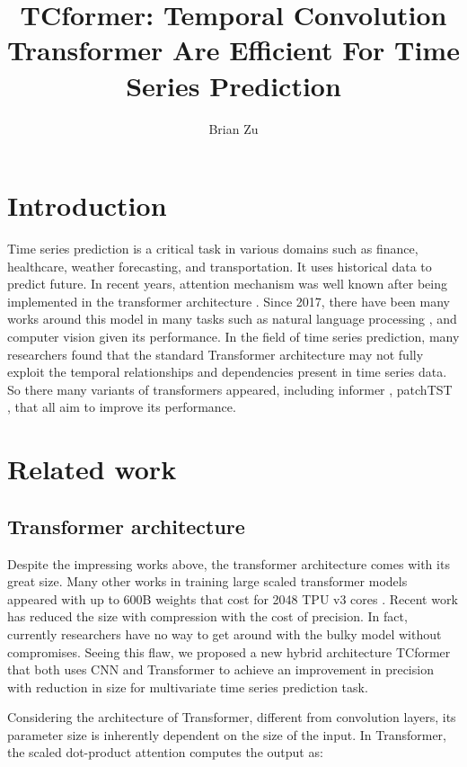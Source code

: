 \documentclass[stu,12pt,floatsintext]{apa7}
\title{TCformer: Temporal Convolution Transformer Are Efficient For Time Series Prediction}
\author{Brian Zu}
\affiliation{}
\begin{document}
\maketitle

\section{Introduction}
Time series prediction is a critical task in various domains such as finance, healthcare, weather forecasting, and transportation. It uses historical data to predict future. In recent years, attention mechanism was well known after being implemented in the transformer architecture \parencite{attention-is-all-you-need}. Since 2017, there have been many works around this model in many tasks such as natural language processing \parencite{few-shot-learners}, and computer vision \parencite{vit} given its performance.  In the field of time series prediction, many researchers found that the standard Transformer architecture may not fully exploit the temporal relationships and dependencies present in time series data. So there many variants of transformers appeared, including informer \parencite{informer}, patchTST \parencite{patchtst}, that all aim to improve its performance. 


\section{Related work}

\subsection{Transformer architecture}

Despite the impressing works above, the transformer architecture comes with its great size. Many other works in training large scaled transformer models appeared with up to 600B weights that cost for 2048 TPU v3 cores \parencite{lepikhin2020gshardscalinggiantmodels}. Recent work \parencite{pmlr-v119-li20m} has reduced the size with compression with the cost of precision. In fact, currently researchers have no way to get around with the bulky model without compromises. Seeing this flaw, we proposed a new hybrid architecture TCformer that both uses CNN and Transformer to achieve an improvement in precision with reduction in size for multivariate time series prediction task. 

Considering the architecture of Transformer, different from convolution layers, its parameter size is inherently dependent on the size of the input. In Transformer, the scaled dot-product attention \parencite{attention-is-all-you-need} computes the output as:
\end{document}
